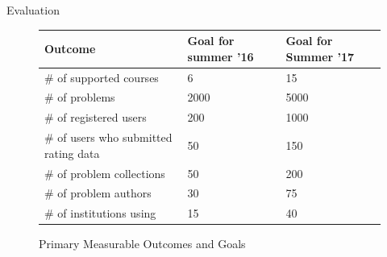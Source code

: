 \documentclass[11pt]{article}
\begin{document}
\begin{section}{Evaluation}
\begin{figure}
\begin{center}
\begin{tabular}{|l|l|l|}
  \hline
  \textbf{Outcome} & \textbf{Goal for summer '16} & \textbf{Goal for
  Summer '17} \\
  \hline
  \hline
  \# of supported courses & 6 & 15 \\
  \hline
  \# of problems & 2000 & 5000 \\
  \hline
  \# of registered users & 200 & 1000 \\
  \hline
  \# of users who submitted rating data & 50 & 150 \\
  \hline
  \# of problem collections & 50 & 200 \\
  \hline
  \# of problem authors & 30 & 75 \\
  \hline
  \# of institutions using & 15 & 40 \\
  \hline
\end{tabular}
\caption{Primary Measurable Outcomes and Goals}
\label{outcomes}
\end{center}
\end{figure}


\end{section}
\end{document}
